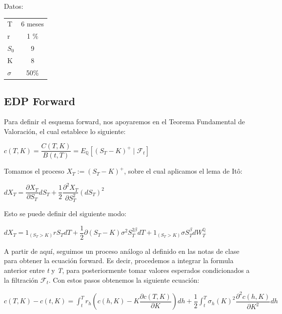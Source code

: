\documentclass[titlepage, 10pt,]{article}
\begin{document}
Datos: \\

\begin{tabular}{| l | c |}
	\hline
		T & 6 meses \\
		r & 1 $\%$ \\
		$S_{0}$ & 9 \\
		K & 8 \\
		$\sigma$ & 50$\%$\\
	\hline	
\end{tabular}

\newpage
\subsection{EDP Forward}

Para definir el esquema forward, nos apoyaremos en el Teorema Fundamental de Valoración, el cual establece lo siguiente:

\begin{center}
	$c(T,K) = \dfrac{C(T,K)}{B(t,T)} = E_{\mathbb{Q}}[(S_{T} - K)^{+} \mid \mathcal{F}_{t}]$
\end{center}

Tomamos el proceso $X_{T} := (S_{T} - K)^{+}$, sobre el cual aplicamos el lema de Itô:

\begin{center}
	$dX_{T} = \dfrac{\partial X_{T}}{\partial S_{T}} dS_{T} + \dfrac{1}{2} \dfrac{\partial^{2} X_{T}}{\partial S_{T}^{2}}(dS_{T})^{2}$
\end{center}

Esto se puede definir del siguiente modo:

\begin{center}
	$dX_{T} = 1_{(S_{T} > K)} r S_{T} dT + \dfrac{1}{2} \partial (S_{T} - K) \sigma^{2}S_{T}^{2\beta}dT + 1_{(S_{T} > K)} \sigma S_{T}^{\beta} dW_{T}^{\mathbb{Q}}$
\end{center}

A partir de aquí, seguimos un proceso análogo al definido en las notas de clase para obtener la ecuación forward. Es decir, procedemos a integrar la formula anterior entre \textit{t} y \textit{T}, para posteriormente tomar valores esperados condicionados a la filtración $\mathcal{F}_{t}$. Con estos pasos obtenemos la siguiente ecuación:

\begin{center}
	$c(T,K) - c(t, K) = \displaystyle \int_{t}^{T} r_{h} \left(c(h, K) - K \dfrac{\partial c(T,K)}{\partial K}\right) dh + \dfrac{1}{2} \int_{t}^{T} \sigma_{h}(K)^{2} \dfrac{\partial^{2}c(h, K)}{\partial K^{2}} dh$
\end{center}
\end{document}
